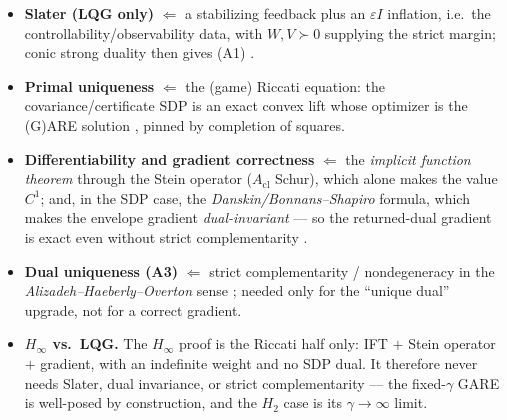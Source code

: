 \documentclass[11pt]{article}
\theoremstyle{definition}
\newcommand{\Acl}{A_{\mathrm{cl}}}
\begin{document}
\begin{itemize}
\item \textbf{Slater (LQG only)} $\Leftarrow$ a stabilizing feedback plus an
$\varepsilon I$ inflation, i.e.\ the controllability/observability data, with
$W,V\succ0$ supplying the strict margin; conic strong duality then gives (A1)
\cite{BonnansShapiro,BoydVandenberghe}.
\item \textbf{Primal uniqueness} $\Leftarrow$ the (game) Riccati equation: the
covariance/certificate SDP is an exact convex lift whose optimizer is the
(G)ARE solution \cite{LancasterRodman,AndersonMoore,BasarBernhard}, pinned by
completion of squares.
\item \textbf{Differentiability and gradient correctness} $\Leftarrow$ the
\emph{implicit function theorem} through the Stein operator ($\Acl$ Schur), which
alone makes the value $C^1$; and, in the SDP case, the
\emph{Danskin/Bonnans--Shapiro} formula, which makes the envelope gradient
\emph{dual-invariant} --- so the returned-dual gradient is exact even without
strict complementarity \cite{BonnansShapiro}.
\item \textbf{Dual uniqueness (A3)} $\Leftarrow$ strict complementarity /
nondegeneracy in the \emph{Alizadeh--Haeberly--Overton} sense
\cite{AHO,Shapiro97}; needed only for the ``unique dual'' upgrade, not for a
correct gradient.
\item \textbf{$H_\infty$ vs.\ LQG.} The $H_\infty$ proof is the Riccati half only:
IFT $+$ Stein operator $+$ gradient, with an indefinite weight and no SDP dual. It
therefore never needs Slater, dual invariance, or strict complementarity --- the
fixed-$\gamma$ GARE is well-posed by construction, and the $H_2$ case is its
$\gamma\to\infty$ limit.
\end{itemize}
\end{document}
